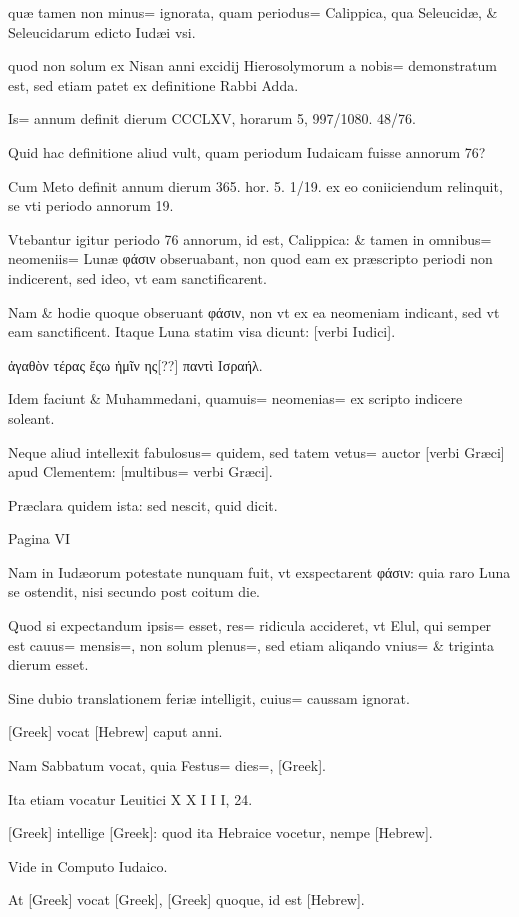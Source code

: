 \begin{parnumbers}
quæ tamen non minus= ignorata, quam periodus= Calippica, qua Seleucidæ, \& Seleucidarum edicto Iudæi vsi.

quod non solum ex Nisan anni excidij Hierosolymorum a nobis= demonstratum est, sed etiam patet ex definitione Rabbi Adda.

Is= annum definit dierum CCCLXV, horarum 5, 997/1080. 48/76.

Quid hac definitione aliud vult, quam periodum Iudaicam fuisse annorum 76?

Cum Meto definit annum dierum 365. hor. 5. 1/19. ex eo coniiciendum relinquit, se vti periodo annorum 19.

Vtebantur igitur periodo 76 annorum, id est, Calippica: \& tamen in omnibus= neomeniis= Lunæ φάσιν obseruabant, non quod eam ex præscripto periodi non indicerent, sed ideo, vt eam sanctificarent.

Nam \& hodie quoque obseruant φάσιν, non vt ex ea neomeniam indicant, sed vt eam sanctificent. Itaque Luna statim visa dicunt: [verbi Iudici].

ἀγαθὸν τέρας ἔςω ἡμῖν ης[??] παντὶ Ισραήλ.

Idem faciunt \& Muhammedani, quamuis= neomenias= ex scripto indicere soleant.

Neque aliud intellexit fabulosus= quidem, sed tatem vetus= auctor [verbi Græci] apud Clementem: [multibus= verbi Græci].

Præclara quidem ista: sed nescit, quid dicit.

Pagina VI

Nam in Iudæorum potestate nunquam fuit, vt exspectarent φάσιν: quia raro Luna se ostendit, nisi secundo post coitum die.

Quod si expectandum ipsis= esset, res= ridicula accideret, vt Elul, qui semper est cauus= mensis=, non solum plenus=, sed etiam aliqando vnius= \& triginta dierum esset.

Sine dubio translationem feriæ intelligit, cuius= caussam ignorat.

[Greek] vocat [Hebrew] caput anni.

Nam Sabbatum vocat, quia Festus= dies=, [Greek].

Ita etiam vocatur Leuitici X X I I I, 24.

[Greek] intellige [Greek]: quod ita Hebraice vocetur, nempe [Hebrew].

Vide in Computo Iudaico.

At [Greek] vocat [Greek], [Greek] quoque, id est [Hebrew].


\end{parnumbers}
